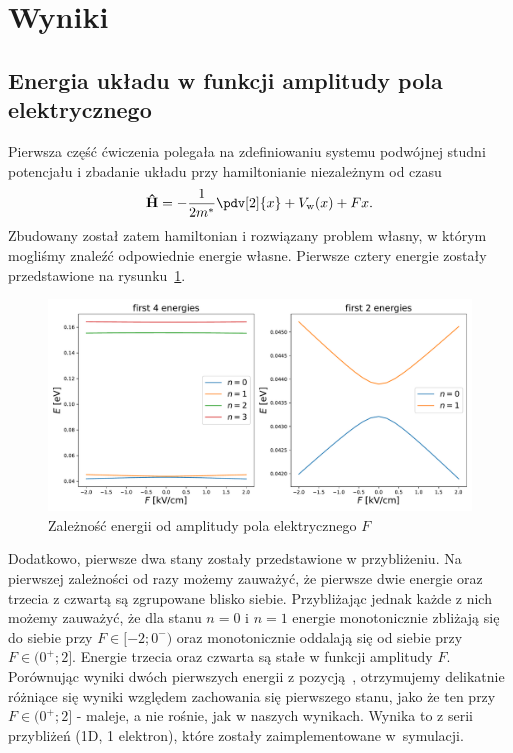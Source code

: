 \documentclass{article}
\begin{document}
\section{Wyniki}
\subsection{Energia układu w funkcji amplitudy pola elektrycznego}
Pierwsza część ćwiczenia polegała na zdefiniowaniu systemu podwójnej studni potencjału i zbadanie układu przy hamiltonianie niezależnym od czasu
\begin{gather}
    \mathbf{\hat{H}} = -\frac{1}{2m^*}\pdv[2]{x} + V_{\text{w}}(x) + Fx.
\end{gather}
Zbudowany został zatem hamiltonian i rozwiązany problem własny, w którym mogliśmy znaleźć odpowiednie energie własne.
Pierwsze cztery energie zostały przedstawione na rysunku~\ref{fig:ex1}.
\begin{figure}[htp!]
    \centering
    \includegraphics[width=0.9\linewidth]{ex1.pdf}
    \caption{Zależność energii od amplitudy pola elektrycznego $F$}
    \label{fig:ex1}
\end{figure}
Dodatkowo, pierwsze dwa stany zostały przedstawione w przybliżeniu.
Na pierwszej zależności od razy możemy zauważyć, że pierwsze dwie energie oraz trzecia z czwartą są zgrupowane blisko siebie.
Przybliżając jednak każde z nich możemy zauważyć, że dla stanu $n=0$ i $n=1$ energie monotonicznie zbliżają się do siebie przy $F\in [-2; 0^-)$ oraz monotonicznie oddalają się od siebie przy $F\in (0^+; 2]$.
Energie trzecia oraz czwarta są stałe w funkcji amplitudy $F$.
Porównując wyniki dwóch pierwszych energii z pozycją~\cite{Kim2015}, otrzymujemy delikatnie różniące się wyniki względem zachowania się pierwszego stanu, jako że ten przy $F\in (0^+; 2]$ - maleje, a nie rośnie, jak w naszych wynikach.
Wynika to z serii przybliżeń (1D, 1 elektron), które zostały zaimplementowane w~symulacji.
\end{document}
